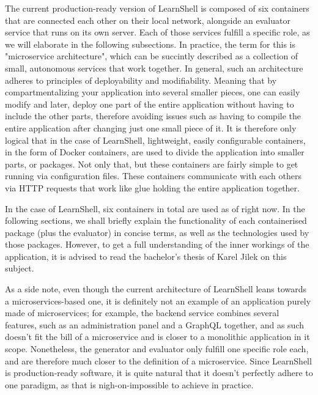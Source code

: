\documentclass[thesis=B,english]{FITthesis}[2019/12/23]
\begin{document}
The current production-ready version of LearnShell is composed of six containers that are connected each other on their local network, alongside an evaluator service that runs on its own server. Each of those services fulfill a specific role, as we will elaborate in the following subsections. In practice, the term for this is "microservice architecture", which can be succintly described as a collection of small, autonomous services that work together. \cite{building-microservices} 
\newline
In general, such an architecture adheres to principles of deployability and modifiability. \cite{building-microservices,architecting-chen} Meaning that by compartmentalizing your application into several smaller pieces, one can easily modify and later, deploy one part of the entire application without having to include the other parts, therefore avoiding issues such as having to compile the entire application after changing just one small piece of it. It is therefore only logical that in the case of LearnShell, lightweight, easily configurable containers, in the form of Docker containers, are used to divide the application into smaller parts, or packages. Not only that, but these containers are fairly simple to get running via configuration files. These containers communicate with each others via HTTP requests that work like glue holding the entire application together. \cite{microservices}

In the case of LearnShell, six containers in total are used as of right now. In the following sections, we shall briefly explain the functionality of each containerised package (plus the evaluator) in concise terms, as well as the technologies used by those packages. However, to get a full understanding of the inner workings of the application, it is advised to read the bachelor's thesis of Karel Jilek on this subject.

As a side note, even though the current architecture of LearnShell leans towards a microservices-based one, it is definitely not an example of an application purely made of microservices; for example, the backend service combines several features, such as an administration panel and a GraphQL together, and as such doesn't fit the bill of a microservice and is closer to a monolithic application in it scope. Nonetheless, the generator and evaluator only fulfill one specific role each, and are therefore much closer to the definition of a microservice. Since LearnShell is production-ready software, it is quite natural that it doesn't perfectly adhere to one paradigm, as that is nigh-on-impossible to achieve in practice.
\end{document}
